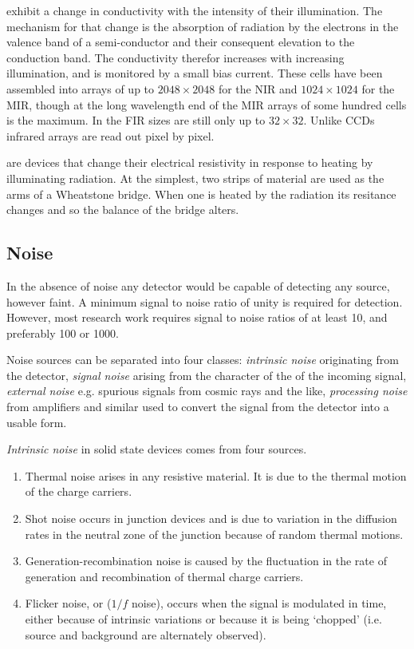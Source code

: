  exhibit a change in conductivity with the 
intensity of their illumination. The mechanism for that change is the 
absorption of radiation by the electrons in the valence band of a 
semi-conductor and their consequent elevation to the conduction band. The
conductivity therefor increases with increasing illumination, and is monitored
by a small bias current. These cells have been assembled into arrays of 
up to $2048\times 2048$ for the NIR and $1024\times 1024$ for the MIR, 
though at the long wavelength end of the MIR arrays of some hundred cells is
the maximum. In the FIR sizes are still only up to $32\times 32$. Unlike
CCDs infrared arrays are read out pixel by pixel. 

 are devices that change their electrical
resistivity in response to heating by illuminating radiation. At the
simplest, two strips of material are used as the arms of a Wheatstone
bridge. When one is heated by the radiation its resitance changes and
so the balance of the bridge alters. 

\subsection{Noise}

In the absence of noise any detector would be capable of detecting any source,
however faint. A minimum signal to noise ratio of unity is required for 
detection. However, most research work requires signal to noise ratios of
at least 10, and preferably 100 or 1000. 

Noise sources can be separated into four classes: {\it intrinsic noise} 
originating from the detector, {\it signal noise} arising from the character
of the of the incoming signal, {\it external noise} e.g. spurious signals
from cosmic rays and the like, {\it processing noise} from amplifiers and
similar used to convert the signal from the detector into a usable form.

{\it Intrinsic noise} in solid state devices comes from four sources.
\begin{enumerate}
\item Thermal noise arises in any resistive material. It is due to the thermal
motion of the charge carriers. 
\item Shot noise occurs in junction devices and is due to variation in 
the diffusion rates in the neutral zone of the junction because of random
thermal motions. 
\item Generation-recombination noise is caused by the fluctuation in the
rate of generation and recombination of thermal charge carriers. 
\item Flicker noise, or ($1/f$ noise), occurs when the signal is modulated
in time, either because of intrinsic variations or because it is being
`chopped' (i.e. source and background are alternately observed). 
\end{enumerate}

